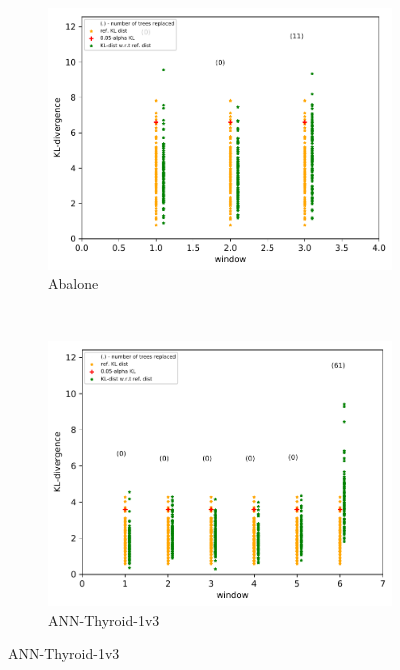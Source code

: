 \documentclass{article} %
\begin{document}
\begin{figure}
	\centering
	\captionsetup{labelformat=empty}
	\begin{subfigure}[b]{0.23\textwidth}
		\includegraphics[width=\textwidth]{figures/test_concept_drift_abalone}
		\caption{Abalone}
		\label{fig:concept_drift_abalone}
	\end{subfigure}
	~ %
	\begin{subfigure}[b]{0.23\textwidth}
		\includegraphics[width=\textwidth]{figures/test_concept_drift_ann_thyroid_1v3}
		\caption{ANN-Thyroid-1v3}
		\label{fig:concept_drift_ann_thyroid}

\end{subfigure}
\end{figure}
\end{document}
